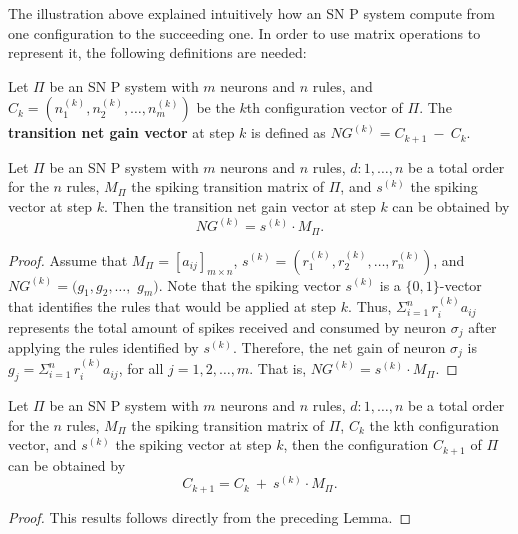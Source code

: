 \documentclass[runningheads]{llncs}
\begin{document}
The illustration above explained intuitively how an SN P system
compute from one configuration to the succeeding one. In order to
use matrix operations to represent it, the following definitions are
needed:

\begin{definition}
Let $\Pi$ be an SN P system with $m$ neurons and $n$ rules, and
$C_{k} = (n_{1}^{(k)}, n_{2}^{(k)}, \ldots , n_{m}^{(k)})$ be the
$k$th configuration vector of $\Pi$. The {\bf transition net gain
vector} at step $k$ is defined as $NG^{(k)}= C_{k+1}~ - ~ C_{k}.$
\end{definition}


\begin{lemma}
Let $\Pi$ be an SN P system with $m$ neurons and $n$ rules,
$d:1,\dots, n$ be a total order for the $n$ rules, $M_{\Pi}$ the
spiking transition matrix of $\Pi$, and $s^{(k)}$ the spiking vector
at step $k$. Then the transition net gain vector at step $k$ can be
obtained by
\begin{equation}\label{transition-gain}
NG^{(k)} = s^{(k)}\cdot M_{\Pi}.
\end{equation}
\end{lemma}
\begin{proof} Assume that $M_{\Pi}=[a_{ij}]_{m\times n}$, $s^{(k)} = (r_1^{(k)},
r_2^{(k)}, \ldots , r_n^{(k)})$, and $NG^{(k)}= (g_{1}, g_{2},
\ldots,$ $g_{m})$. Note that the spiking vector $s^{(k)}$ is a
$\{0,1\}$-vector that identifies the rules that would be applied at
step $k$. Thus, $\Sigma_{i=1}^{n}\, r_{i}^{(k)}a_{ij}$ represents
the total amount of spikes received and consumed by neuron
$\sigma_{j}$ after applying the rules identified by $s^{(k)}$.
Therefore, the net gain of neuron $\sigma_j$ is
$g_{j}=\Sigma_{i=1}^{n}\, r_{i}^{(k)}a_{ij}$, for all $j = 1,2,
\ldots ,m$. That is, $NG^{(k)} = s^{(k)}\cdot M_{\Pi}$.
\end{proof}

\begin{theorem}
Let $\Pi$ be an SN P system with $m$ neurons and $n$ rules,
$d:1,\dots, n$ be a total order for the $n$ rules, $M_{\Pi}$ the
spiking transition matrix of $\Pi$, $C_k$ the kth configuration
vector, and $s^{(k)}$ the spiking vector at step $k$, then the
configuration $C_{k+1}$ of $\Pi$ can be obtained by
\begin{equation}\label{next-config}
C_{k+1} =  C_{k} ~ + ~ s^{(k)}\cdot M_{\Pi}.
\end{equation}
\end{theorem}
\begin{proof}
This results follows directly from the preceding Lemma.
\end{proof}
\end{document}

